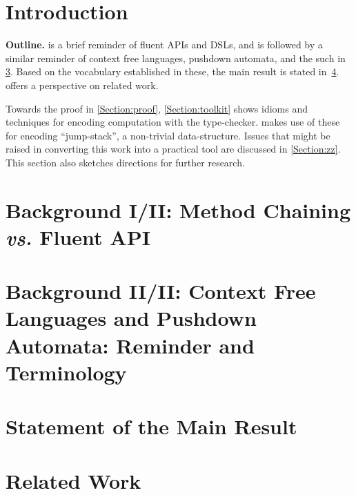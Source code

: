 \documentclass[a4paper,USenglish]{lipics}
\author{Anonymized for the submission}
\begin{document}
\maketitle
\begin{abstract}
  
\end{abstract}

\section{Introduction}


\textbf{Outline.}
 is a brief reminder of fluent APIs 
  and DSLs, and is followed by a similar reminder of 
  context free languages, pushdown automata, and the such in \cref{Section:pushdown}.
Based on the vocabulary established in these, 
  the main result is stated in~\cref{Section:result}.
 offers a perspective on related work.

Towards the proof in \cref{Section:proof}, \cref{Section:toolkit} 
  shows idioms and techniques for encoding computation with    
  the \Java type-checker.
 makes use of these for encoding 
  ``jump-stack'', a non-trivial data-structure.
Issues that might be raised in converting 
  this work into a practical tool are discussed in \cref{Section:zz}.
This section also sketches directions for further research.

\section{Background I/II: Method Chaining \emph{vs.} Fluent API}
\label{Section:fluent}


\section{Background II/II: Context Free Languages and Pushdown Automata: Reminder and Terminology}
\label{Section:pushdown}


\section{Statement of the Main Result}
\label{Section:result}


\section{Related Work}
\label{Section:related}

\end{document}
